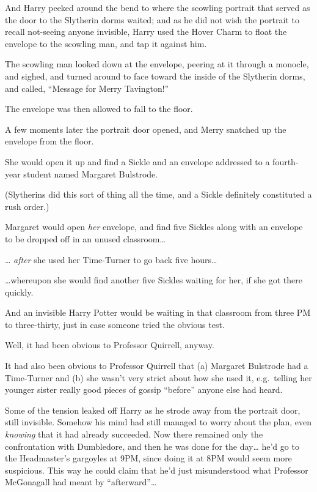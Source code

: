 And Harry peeked around the bend to where the scowling portrait that
served as the door to the Slytherin dorms waited; and as he did not wish
the portrait to recall not-seeing anyone invisible, Harry used the Hover
Charm to float the envelope to the scowling man, and tap it against him.

The scowling man looked down at the envelope, peering at it through a
monocle, and sighed, and turned around to face toward the inside of the
Slytherin dorms, and called, ``Message for Merry Tavington!''

The envelope was then allowed to fall to the floor.

A few moments later the portrait door opened, and Merry snatched up the
envelope from the floor.

She would open it up and find a Sickle and an envelope addressed to a
fourth-year student named Margaret Bulstrode.

(Slytherins did this sort of thing all the time, and a Sickle definitely
constituted a rush order.)

Margaret would open \emph{her} envelope, and find five Sickles along
with an envelope to be dropped off in an unused classroom\ldots{}

\ldots{} \emph{after} she used her Time-Turner to go back five
hours\ldots{}

\ldots{}whereupon she would find another five Sickles waiting for her,
if she got there quickly.

And an invisible Harry Potter would be waiting in that classroom from
three PM to three-thirty, just in case someone tried the obvious test.

Well, it had been obvious to Professor Quirrell, anyway.

It had also been obvious to Professor Quirrell that (a) Margaret
Bulstrode had a Time-Turner and (b) she wasn't very strict about how she
used it, e.g.~telling her younger sister really good pieces of gossip
``before'' anyone else had heard.

Some of the tension leaked off Harry as he strode away from the portrait
door, still invisible. Somehow his mind had still managed to worry about
the plan, even \emph{knowing} that it had already succeeded. Now there
remained only the confrontation with Dumbledore, and then he was done
for the day\ldots{} he'd go to the Headmaster's gargoyles at 9PM, since
doing it at 8PM would seem more suspicious. This way he could claim that
he'd just misunderstood what Professor McGonagall had meant by
``afterward''\ldots{}

